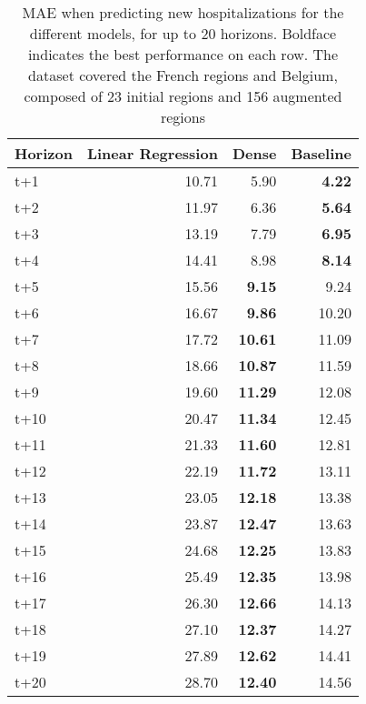 \begin{table}[H]
\centering
\caption{MAE when predicting new hospitalizations for the different models, for up to 20 horizons. Boldface indicates the best performance on each row. The dataset covered the French regions and Belgium, composed of 23 initial regions and 156 augmented regions }
\label{tab:MAE_comparison}
\begin{tabular}{lrrr}
\toprule
Horizon &  Linear Regression &  Dense &  Baseline \\
\midrule
t+1  & 10.71  & 5.90  & \textbf{4.22}  \\
t+2  & 11.97  & 6.36  & \textbf{5.64}  \\
t+3  & 13.19  & 7.79  & \textbf{6.95}  \\
t+4  & 14.41  & 8.98  & \textbf{8.14}  \\
t+5  & 15.56  & \textbf{9.15}  & 9.24  \\
t+6  & 16.67  & \textbf{9.86}  & 10.20  \\
t+7  & 17.72  & \textbf{10.61}  & 11.09  \\
t+8  & 18.66  & \textbf{10.87}  & 11.59  \\
t+9  & 19.60  & \textbf{11.29}  & 12.08  \\
t+10  & 20.47  & \textbf{11.34}  & 12.45  \\
t+11  & 21.33  & \textbf{11.60}  & 12.81  \\
t+12  & 22.19  & \textbf{11.72}  & 13.11  \\
t+13  & 23.05  & \textbf{12.18}  & 13.38  \\
t+14  & 23.87  & \textbf{12.47}  & 13.63  \\
t+15  & 24.68  & \textbf{12.25}  & 13.83  \\
t+16  & 25.49  & \textbf{12.35}  & 13.98  \\
t+17  & 26.30  & \textbf{12.66}  & 14.13  \\
t+18  & 27.10  & \textbf{12.37}  & 14.27  \\
t+19  & 27.89  & \textbf{12.62}  & 14.41  \\
t+20  & 28.70  & \textbf{12.40}  & 14.56  \\

\bottomrule
\end{tabular}
\end{table}
